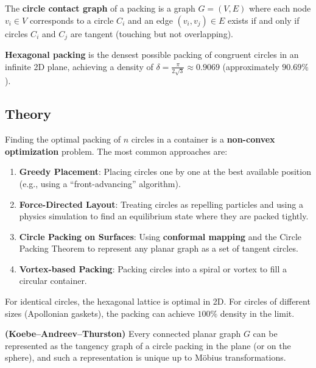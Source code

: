 \begin{definition}\label{def:circle_contact_graph}
The \textbf{circle contact graph} of a packing is a graph $G = (V, E)$ where each node $v_i \in V$ corresponds to a circle $C_i$ and an edge $(v_i, v_j) \in E$ exists if and only if circles $C_i$ and $C_j$ are tangent (touching but not overlapping).
\end{definition}

\begin{definition}\label{def:hexagonal_packing}
\textbf{Hexagonal packing} is the densest possible packing of congruent circles in an infinite 2D plane, achieving a density of $\delta = \frac{\pi}{2\sqrt{3}} \approx 0.9069$ (approximately $90.69\%$).
\end{definition}

\subsection{Theory}
Finding the optimal packing of $n$ circles in a container is a \textbf{non-convex optimization} problem. The most common approaches are:
\begin{enumerate}
    \item \textbf{Greedy Placement}: Placing circles one by one at the best available position (e.g., using a ``front-advancing'' algorithm).
    \item \textbf{Force-Directed Layout}: Treating circles as repelling particles and using a physics simulation to find an equilibrium state where they are packed tightly.
    \item \textbf{Circle Packing on Surfaces}: Using \textbf{conformal mapping} and the Circle Packing Theorem to represent any planar graph as a set of tangent circles.
    \item \textbf{Vortex-based Packing}: Packing circles into a spiral or vortex to fill a circular container.
\end{enumerate}

For identical circles, the hexagonal lattice is optimal in 2D. For circles of different sizes (Apollonian gaskets), the packing can achieve $100\%$ density in the limit.

\begin{theorem}\label{thm:circle_packing_thm}
\textbf{(Koebe--Andreev--Thurston)} Every connected planar graph $G$ can be represented as the tangency graph of a circle packing in the plane (or on the sphere), and such a representation is unique up to Möbius transformations.
\end{theorem}

